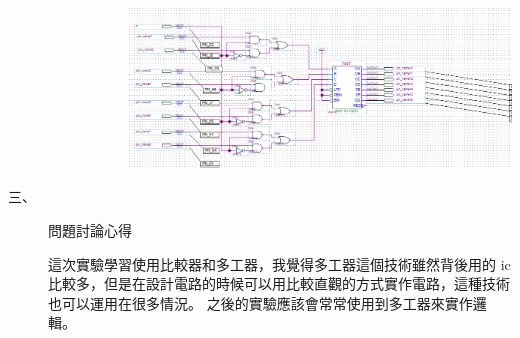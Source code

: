 \documentclass[12pt, a4paper]{article}
\begin{document}
\begin{description}
\begin{description}
\begin{description}
              \includegraphics[width=13cm]{./image/ex3.png}
            \end{description}
        \normalsize
      \end{description}
    \item [三、]問題討論心得 \\[.6cm]
      \begin{minipage}[t]{\linewidth}
        \fontsize{16}{18}\selectfont
          這次實驗學習使用比較器和多工器，我覺得多工器這個技術雖然背後用的 ic 比較多，但是在設計電路的時候可以用比較直觀的方式實作電路，這種技術也可以運用在很多情況。
          之後的實驗應該會常常使用到多工器來實作邏輯。
        \normalsize  
      \end{minipage}
  \normalsize
\end{description}
\end{document}
